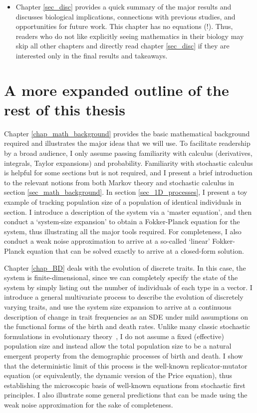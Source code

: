 \begin{itemize}
		\item Chapter \ref{sec_disc} provides a quick summary of the major results and discusses biological implications, connections with previous studies, and opportunities for future work. This chapter has no equations (!). Thus, readers who do not like explicitly seeing mathematics in their biology may skip all other chapters and directly read chapter \ref{sec_disc} if they are interested only in the final results and takeaways. 
\end{itemize}
\section{A more expanded outline of the rest of this thesis}

Chapter \ref{chap_math_background} provides the basic mathematical background required and illustrates the major ideas that we will use. To facilitate readership by a broad audience, I only assume passing familiarity with calculus (derivatives, integrals, Taylor expansions) and probability. Familiarity with stochastic calculus is helpful for some sections but is not required, and I present a brief introduction to the relevant notions from both Markov theory and stochastic calculus in section \ref{sec_math_background}. In section \ref{sec_1D_processes}, I present a toy example of tracking population size of a population of identical individuals in section. I introduce a description of the system via a `master equation', and then conduct a `system-size expansion' to obtain a Fokker-Planck equation for the system, thus illustrating all the major tools required. For completeness, I also conduct a weak noise approximation to arrive at a so-called `linear' Fokker-Planck equation that can be solved exactly to arrive at a closed-form solution.

Chapter \ref{chap_BD} deals with the evolution of discrete traits. In this case, the system is finite-dimensional, since we can completely specify the state of the system by simply listing out the number of individuals of each type in a vector. I introduce a general multivariate process to describe the evolution of discretely varying traits, and use the system size expansion to arrive at a continuous description of change in trait frequencies as an SDE under mild assumptions on the functional forms of the birth and death rates. Unlike many classic stochastic formulations in evolutionary theory~\citep{fisher_genetical_1930,wright_evolution_1931,moran_random_1958,crow_introduction_1970, lande_natural_1976,kimura_probability_1974}, I do not assume a fixed (effective) population size and instead allow the total population size to be a natural emergent property from the demographic processes of birth and death. I show that the deterministic limit of this process is the well-known replicator-mutator equation (or equivalently, the dynamic version of the Price equation), thus establishing the microscopic basis of well-known equations from stochastic first principles. I also illustrate some general predictions that can be made using the weak noise approximation for the sake of completeness.

